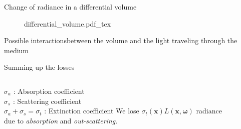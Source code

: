 \documentclass[
  english,            %
  aspectratio=169,    %
]{tumbeamer}
\newcommand\bx[0]{\textbf{x}}
\newcommand\bomega[0]{\boldsymbol{\omega}}
\newcommand{\incfig}[1]{%
    \def\svgwidth{\columnwidth}
    {#1.pdf_tex}
}
\begin{document}
\begin{frame}{Change of radiance in a differential volume}
    \begin{figure}[ht]
        \centering
        \incfig{differential_volume}
        \label{fig:vre}
    \end{figure}
\end{frame}


\begin{frame}{Possible interactions}{between the volume and the light
    traveling through the medium}
\begin{figure}[ht]
    \centering
    
    \label{fig:interactions}
\end{figure}
\end{frame}

\begin{frame}{Summing up the losses}
\begin{figure}[ht]
    \centering
    
    \label{fig:interactions}
\end{figure}

\begin{columns}[t, onlytextwidth]
    $\sigma_a$ : Absorption coefficient  \\
    $\sigma_s$ : Scattering coefficient \\
    $\sigma_a + \sigma_s = \sigma_t $ : Extinction coefficient
    We lose 
    $\sigma_t(\bx)L(\bx, \bomega)$
    radiance \\ due to \textit{absorption} and \textit{out-scattering}.
    
\end{columns}
\vspace{3mm}


\end{frame}
\end{document}
